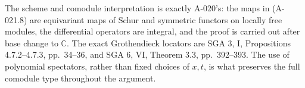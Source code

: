 The scheme and comodule interpretation is exactly A-020's:
the maps in (A-021.8) are equivariant maps of Schur and
symmetric functors on locally free modules, the differential
operators are integral, and the proof is carried out after
base change to $\mathbb C$. The exact Grothendieck locators
are SGA 3, I, Propositions 4.7.2--4.7.3, pp.~34--36, and
SGA 6, VI, Theorem 3.3, pp.~392--393. The use of polynomial
spectators, rather than fixed choices of $x,t$, is what
preserves the full comodule type throughout the argument.
